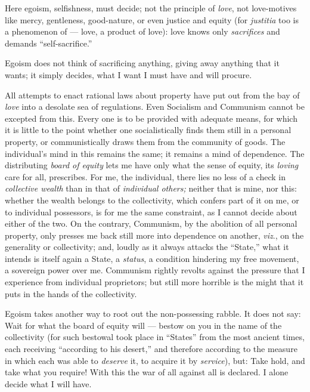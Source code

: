 Here egoism, selfishness, must decide; not the principle of \textit{love}, not 
love-motives like mercy, gentleness, good-nature, or even justice and equity 
(for \textit{justitia} too is a phenomenon of --- love, a product of love): 
love knows only \textit{sacrifices} and demands ``self-sacrifice.''

Egoism does not think of sacrificing anything, giving away anything that it 
wants; it simply decides, what I want I must have and will procure.

All attempts to enact rational laws about property have put out from the bay 
of \textit{love} into a desolate sea of regulations. Even Socialism and 
Communism cannot be excepted from this. Every one is to be provided with 
adequate means, for which it is little to the point whether one 
socialistically finds them still in a personal property, or communistically 
draws them from the community of goods. The individual's mind in this remains 
the same; it remains a mind of dependence. The distributing \textit{board of 
equity} lets me have only what the sense of equity, its \textit{loving} care 
for all, prescribes. For me, the individual, there lies no less of a check in 
\textit{collective wealth} than in that of \textit{individual others;} neither 
that is mine, nor this: whether the wealth belongs to the collectivity, which 
confers part of it on me, or to individual possessors, is for me the same 
constraint, as I cannot decide about either of the two. On the contrary, 
Communism, by the abolition of all personal property, only presses me back 
still more into dependence on another, \textit{viz}., on the generality or 
collectivity; and, loudly as it always attacks the ``State,'' what it 
intends is itself again a State, a \textit{status}, a condition hindering my 
free movement, a sovereign power over me. Communism rightly revolts against 
the pressure that I experience from individual proprietors; but still more 
horrible is the might that it puts in the hands of the collectivity.

Egoism takes another way to root out the non-possessing rabble. It does not 
say: Wait for what the board of equity will --- bestow on you in the name of 
the collectivity (for such bestowal took place in ``States'' from the most 
ancient times, each receiving ``according to his desert,'' and therefore 
according to the measure in which each was able to \textit{deserve} it, to 
acquire it by \textit{service}), but: Take hold, and take what you require! 
With this the war of all against all is declared. I alone decide what I will 
have.

